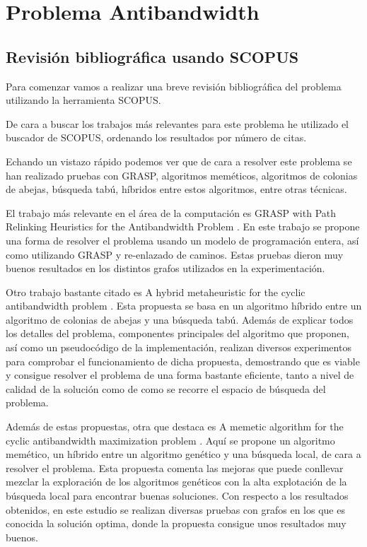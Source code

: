 \section{Problema Antibandwidth}

\subsection{Revisión bibliográfica usando SCOPUS}

Para comenzar vamos a realizar una breve revisión bibliográfica del problema utilizando la herramienta SCOPUS.

De cara a buscar los trabajos más relevantes para este problema he utilizado el buscador de SCOPUS, ordenando los resultados por número de citas.

Echando un vistazo rápido podemos ver que de cara a resolver este problema se han realizado pruebas con GRASP, algoritmos meméticos, algoritmos de colonias de abejas, búsqueda tabú, híbridos entre estos algoritmos, entre otras técnicas.


El trabajo más relevante en el área de la computación es GRASP with Path Relinking Heuristics for the
Antibandwidth Problem \cite{antibandwidthGRASP}. En este trabajo se propone una forma de resolver el problema usando un modelo de programación entera, así como utilizando GRASP y re-enlazado de caminos. Estas pruebas dieron muy buenos resultados en los distintos grafos utilizados en la experimentación.

Otro trabajo bastante citado es A hybrid metaheuristic for the cyclic antibandwidth problem \cite{hybridMetaheuristicAntibandwith}. Esta propuesta se basa en un algoritmo híbrido entre un algoritmo de colonias de abejas y una búsqueda tabú. Además de explicar todos los detalles del problema, componentes principales del algoritmo que proponen, así como un pseudocódigo de la implementación, realizan diversos experimentos para comprobar el funcionamiento de dicha propuesta, demostrando que es viable y consigue resolver el problema de una forma bastante eficiente, tanto a nivel de calidad de la solución como de como se recorre el espacio de búsqueda del problema.

Además de estas propuestas, otra que destaca es A memetic algorithm for the cyclic antibandwidth maximization problem \cite{memeticoAntibandwith}. Aquí se propone un algoritmo memético, un híbrido entre un algoritmo genético y una búsqueda local, de cara a resolver el problema. Esta propuesta comenta las mejoras que puede conllevar mezclar la exploración de los algoritmos genéticos con la alta explotación de la búsqueda local para encontrar buenas soluciones. Con respecto a los resultados obtenidos, en este estudio se realizan diversas pruebas con grafos en los que es conocida la solución optima, donde la propuesta consigue unos resultados muy buenos.

